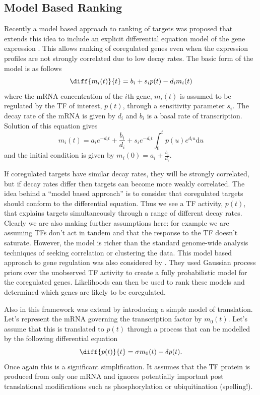 \documentclass{article}
\begin{document}
\subsection{Model Based Ranking}

Recently a  model based  approach to ranking  of targets  was proposed
that extends  this idea to  include an explicit  differential equation
model  of  the gene  expression  \cite{Barenco:ranked06}. This  allows
ranking of coregulated genes even when the expression profiles are not
strongly  correlated due to  low decay  rates. The  basic form  of the
model is as follows
\begin{equation}
  \diff{m_i(t)}{t} = b_i + s_i p(t) - d_i m_i(t)
\end{equation}
where the mRNA concentration of the $i$th gene, $m_i(t)$ is assumed to
be  regulated by  the TF  of interest,  $p(t)$, through  a sensitivity
parameter $s_i$.  The decay  rate of  the mRNA is  given by  $d_i$ and
$b_i$  is a  basal rate  of transcription.  Solution of  this equation
gives
\begin{equation}
  m_i(t) = a_i e^{-d_it} + \frac{b_i}{d_i} + s_i
  e^{-d_it}\int_0^tp(u)e^{d_i u}\mathrm{d} u \label{eq:linearOperator}
\end{equation}
and the initial condition is given by $m_i(0)=a_i + \frac{b_i}{d_i}$. 

If coregulated targets have similar decay rates, they will be strongly
correlated, but  if decay  rates differ then  targets can  become more
weakly correlated.  The  idea behind a ``model based  approach'' is to
consider that  coregulated targets should conform  to the differential
equation. Thus  we see  a TF activity,  $p(t)$, that  explains targets
simultaneously through  a range of different decay  rates.  Clearly we
are also making further assumptions  here: for example we are assuming
TFs  don't act  in tandem  and  that the  response to  the TF  doesn't
saturate. However,  the model is richer than  the standard genome-wide
analysis   techniques  of  seeking   correlation  or   clustering  the
data. This model based approach to gene regulation was also considered
by  \cite{Gao:latent08}. They  used Gaussian  process priors  over the
unobserved TF activity  to create a fully probabilistic  model for the
coregulated genes.  Likelihoods can then  be used to rank these models
and determined which genes are likely to be coregulated.

Also in \cite{Gao:latent08} this framework was extend by introducing a
simple model  of translation.  Let's represent the  mRNA governing the
transcription factor by $m_0(t)$. Let's assume that this is translated
to  $p(t)$ through a  process that  can be  modelled by  the following
differential equation
\begin{equation}
  \diff{p(t)}{t} = \sigma m_0(t) - \delta p(t).
\end{equation}
Once again this  is a significant simplification. It  assumes that the
TF  protein is  produced from  only one  mRNA and  ignores potentially
important post translational  modifications such as phosphorylation or
ubiquitination (spelling!).
\end{document}

